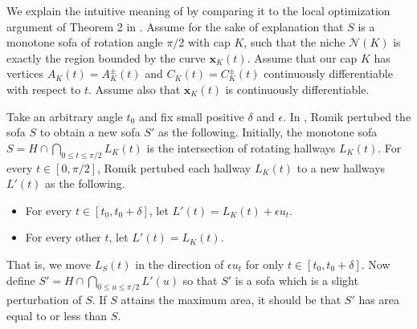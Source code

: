 We explain the intuitive meaning of  by comparing it to the local optimization argument of Theorem 2 in \autocite{romikDifferentialEquationsExact2018}. Assume for the sake of explanation that \(S\) is a monotone sofa of rotation angle \(\pi/2\) with cap \(K\), such that the niche \(\mathcal{N}(K)\) is exactly the region bounded by the curve \(\mathbf{x}_K(t)\). Assume that our cap \(K\) has vertices \(A_K(t) = A_K^{\pm}(t)\) and \(C_K(t) = C_K^{\pm}(t)\) continuously differentiable with respect to \(t\). Assume also that \(\mathbf{x}_K(t)\) is continuously differentiable.

Take an arbitrary angle \(t_0\) and fix small positive \(\delta\) and \(\epsilon\). In \autocite{romikDifferentialEquationsExact2018}, Romik pertubed the sofa \(S\) to obtain a new sofa \(S'\) as the following. Initially, the monotone sofa \(S = H \cap \bigcap_{0 \leq t \leq \pi/2} L_K(t)\) is the intersection of rotating hallways \(L_K(t)\). For every \(t \in [0, \pi/2]\), Romik pertubed each hallway \(L_K(t)\) to a new hallways \(L'(t)\) as the following.

\begin{itemize}
\tightlist
\item
  For every \(t \in [t_0, t_0 + \delta]\), let \(L'(t) = L_K(t) + \epsilon u_t\).
\item
  For every other \(t\), let \(L'(t) = L_K(t)\).
\end{itemize}

That is, we move \(L_S(t)\) in the direction of \(\epsilon u_t\) for only \(t \in [t_0, t_0 + \delta]\). Now define \(S' = H \cap \bigcap_{0 \leq u \leq \pi/2} L'(u)\) so that \(S'\) is a sofa which is a slight perturbation of \(S\). If \(S\) attains the maximum area, it should be that \(S'\) has area equal to or less than \(S\).

